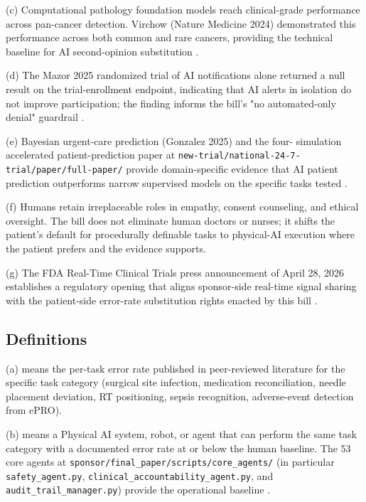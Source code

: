 (c) Computational pathology foundation models reach clinical-grade
performance across pan-cancer detection. Virchow (Nature Medicine
2024) demonstrated this performance across both common and rare
cancers, providing the technical baseline for AI second-opinion
substitution \cite{vorontsov2024virchow}.

(d) The Mazor 2025 randomized trial of AI notifications alone
returned a null result on the trial-enrollment endpoint, indicating
that AI alerts in isolation do not improve participation; the
finding informs the bill's "no automated-only denial" guardrail
\cite{mazor2025ai_notifications_trial}.

(e) Bayesian urgent-care prediction (Gonzalez 2025) and the four-
simulation accelerated patient-prediction paper at
\texttt{new-trial/national-24-7-trial/paper/full-paper/} provide
domain-specific evidence that AI patient prediction outperforms
narrow supervised models on the specific tasks tested
\cite{gonzalez2025bayesian_urgent_care_nsclc, kawchak_2026_19994945}.

(f) Humans retain irreplaceable roles in empathy, consent
counseling, and ethical oversight. The bill does not eliminate human
doctors or nurses; it shifts the patient's default for procedurally
definable tasks to physical-AI execution where the patient prefers
and the evidence supports.

(g) The FDA Real-Time Clinical Trials press announcement of April
28, 2026 establishes a regulatory opening that aligns sponsor-side
real-time signal sharing with the patient-side error-rate
substitution rights enacted by this bill \cite{fda_rtct_press_2026}.

\subsection{Definitions}

(a)  means the per-task error
rate published in peer-reviewed literature for the specific task
category (surgical site infection, medication reconciliation,
needle placement deviation, RT positioning, sepsis recognition,
adverse-event detection from ePRO).

(b)  means a Physical AI system,
robot, or agent that can perform the same task category with a
documented error rate at or below the human baseline. The 53 core
agents at \texttt{sponsor/final\_paper/scripts/core\_agents/} (in
particular \texttt{safety\_agent.py},
\texttt{clinical\_accountability\_agent.py}, and
\texttt{audit\_trail\_manager.py}) provide the operational baseline
\cite{kawchak_2026_19396256}.

